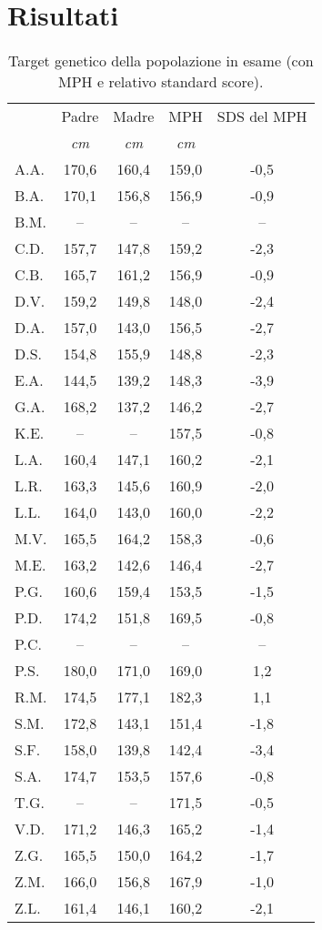 \chapter{Risultati}

\begin{table}[!h]
\begin{center}
\addtolength{\tabcolsep}{12pt}
\renewcommand{\arraystretch}{1.1}
\begin{tabular}{lcccc}
\toprule

 & Padre & Madre & MPH & SDS del MPH \\
 & \emph{cm} & \emph{cm} & \emph{cm} & \\
\midrule
A.A.	& 170,6 & 160,4 & 159,0 & -0,5  \\
B.A.	& 170,1 & 156,8 & 156,9 & -0,9  \\
B.M.	& --    & --    & --    & --    \\
C.D.	& 157,7 & 147,8 & 159,2 & -2,3  \\
C.B.	& 165,7 & 161,2 & 156,9 & -0,9  \\
D.V.	& 159,2 & 149,8 & 148,0 & -2,4  \\
D.A.	& 157,0 & 143,0 & 156,5 & -2,7  \\
D.S.	& 154,8 & 155,9 & 148,8 & -2,3  \\
E.A.	& 144,5 & 139,2 & 148,3 & -3,9  \\
G.A.	& 168,2 & 137,2 & 146,2 & -2,7  \\
K.E.	&  --   &  --   & 157,5 & -0,8  \\            
L.A.	& 160,4 & 147,1 & 160,2 & -2,1  \\
L.R.	& 163,3 & 145,6 & 160,9 & -2,0  \\
L.L.	& 164,0 & 143,0 & 160,0 & -2,2  \\
M.V.	& 165,5 & 164,2 & 158,3 & -0,6  \\
M.E.	& 163,2 & 142,6 & 146,4 & -2,7  \\
P.G.	& 160,6 & 159,4 & 153,5 & -1,5  \\
P.D.	& 174,2 & 151,8 & 169,5 & -0,8  \\
P.C.	& --    & --    & --    & --    \\
P.S.	& 180,0 & 171,0 & 169,0 & 1,2   \\
R.M.	& 174,5 & 177,1 & 182,3 & 1,1   \\
S.M.	& 172,8 & 143,1 & 151,4 & -1,8  \\
S.F.	& 158,0 & 139,8 & 142,4 & -3,4  \\
S.A.	& 174,7 & 153,5 & 157,6 & -0,8  \\
T.G.    & --    & --    & 171,5 & -0,5  \\
V.D.	& 171,2 & 146,3 & 165,2 & -1,4  \\
Z.G.	& 165,5 & 150,0 & 164,2 & -1,7  \\
Z.M.	& 166,0 & 156,8 & 167,9 & -1,0  \\
Z.L.	& 161,4 & 146,1 & 160,2 & -2,1  \\
\bottomrule
\end{tabular}
\end{center}
\caption{Target genetico della popolazione in esame (con MPH e relativo standard score).}
\label{tab:TargetGenetici}
\end{table}

